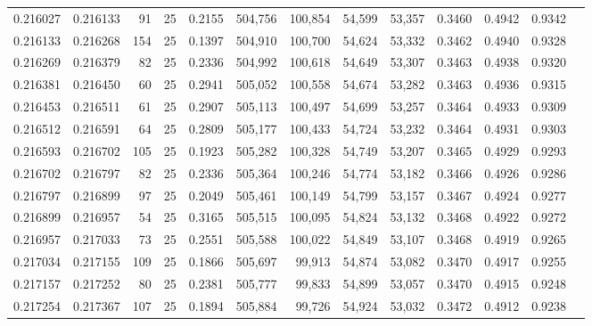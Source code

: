 \begin{tabular}{rrrrrrrrrrrrr}
0.216027 & 0.216133 &    91 &  25 &                                     0.2155 & 504,756 & 100,854 &  54,599 &  53,357 & 0.3460 & 0.4942 & 0.9342 \\
0.216133 & 0.216268 &   154 &  25 &                                     0.1397 & 504,910 & 100,700 &  54,624 &  53,332 & 0.3462 & 0.4940 & 0.9328 \\
0.216269 & 0.216379 &    82 &  25 &                                     0.2336 & 504,992 & 100,618 &  54,649 &  53,307 & 0.3463 & 0.4938 & 0.9320 \\
0.216381 & 0.216450 &    60 &  25 &                                     0.2941 & 505,052 & 100,558 &  54,674 &  53,282 & 0.3463 & 0.4936 & 0.9315 \\
0.216453 & 0.216511 &    61 &  25 &                                     0.2907 & 505,113 & 100,497 &  54,699 &  53,257 & 0.3464 & 0.4933 & 0.9309 \\
0.216512 & 0.216591 &    64 &  25 &                                     0.2809 & 505,177 & 100,433 &  54,724 &  53,232 & 0.3464 & 0.4931 & 0.9303 \\
0.216593 & 0.216702 &   105 &  25 &                                     0.1923 & 505,282 & 100,328 &  54,749 &  53,207 & 0.3465 & 0.4929 & 0.9293 \\
0.216702 & 0.216797 &    82 &  25 &                                     0.2336 & 505,364 & 100,246 &  54,774 &  53,182 & 0.3466 & 0.4926 & 0.9286 \\
0.216797 & 0.216899 &    97 &  25 &                                     0.2049 & 505,461 & 100,149 &  54,799 &  53,157 & 0.3467 & 0.4924 & 0.9277 \\
0.216899 & 0.216957 &    54 &  25 &                                     0.3165 & 505,515 & 100,095 &  54,824 &  53,132 & 0.3468 & 0.4922 & 0.9272 \\
0.216957 & 0.217033 &    73 &  25 &                                     0.2551 & 505,588 & 100,022 &  54,849 &  53,107 & 0.3468 & 0.4919 & 0.9265 \\
0.217034 & 0.217155 &   109 &  25 &                                     0.1866 & 505,697 &  99,913 &  54,874 &  53,082 & 0.3470 & 0.4917 & 0.9255 \\
0.217157 & 0.217252 &    80 &  25 &                                     0.2381 & 505,777 &  99,833 &  54,899 &  53,057 & 0.3470 & 0.4915 & 0.9248 \\
0.217254 & 0.217367 &   107 &  25 &                                     0.1894 & 505,884 &  99,726 &  54,924 &  53,032 & 0.3472 & 0.4912 & 0.9238 \\

\end{tabular}
